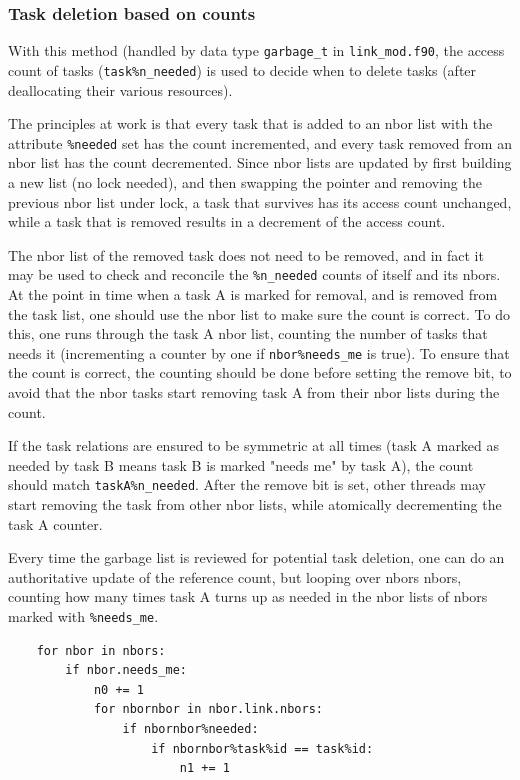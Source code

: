 \documentclass[paper=a4,fontsize=11pt]{scrartcl}
\numberwithin{equation}{section}		%
\numberwithin{figure}{section}			%
\numberwithin{table}{section}				%
\newcommand{\codecolor}{\color{Blue}}
\newcommand{\filecolor}{\color{NavyBlue}}
\newcommand{\File}[1]{{\filecolor\texttt{#1}}}
\newcommand{\Code}[1]{{\codecolor\texttt{#1}}}
\begin{document}
\subsubsection{Task deletion based on  counts}
With this method (handled by data type \Code{garbage\_t} in \File{link\_mod.f90}, the access count of tasks (\verb|task%n_needed|) is used to decide when to delete tasks (after deallocating their various resources).

The principles at work is that every task that is added to an nbor list with the attribute \verb|%needed| set has the count incremented, and every task removed from an nbor list has the count decremented.   Since nbor lists are updated by first building a new list (no lock needed), and then swapping the pointer and removing the previous nbor list under lock, a task that survives has its access count unchanged, while a task that is removed results in a decrement of the access count.

The nbor list of the removed task does not need to be removed, and in fact it may be used to check and reconcile the \verb|%n_needed| counts of itself and its nbors.  At the point in time when a task A is marked for removal, and is removed from the task list, one should use the nbor list to make sure the count is correct.  To do this, one runs through the task A nbor list, counting the number of tasks that needs it (incrementing a counter by one if \verb|nbor%needs_me| is true).  To ensure that the count is correct, the counting should be done before setting the remove bit, to avoid that the nbor tasks start removing task A from their nbor lists during the count.

If the task relations are ensured to be symmetric at all times (task A marked as needed by task B means task B is marked "needs me" by task A), the count should match \verb|taskA%n_needed|.  After the remove bit is set, other threads may start removing the task from other nbor lists, while atomically decrementing the task A counter.

Every time the garbage list is reviewed for potential task deletion, one can do an authoritative update of the reference count, but looping over nbors nbors, counting how many times task A turns up as needed in the nbor lists of nbors marked with \verb|%needs_me|.
{\small\codecolor\begin{verbatim}
    for nbor in nbors:
        if nbor.needs_me:
            n0 += 1
            for nbornbor in nbor.link.nbors:
                if nbornbor%needed:
                    if nbornbor%task%id == task%id:
                        n1 += 1
\end{verbatim}}
\end{document}

